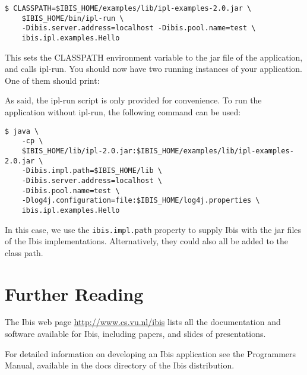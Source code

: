 \documentclass[a4paper,10pt]{article}
\begin{document}
\noindent
{\small
\begin{verbatim}
$ CLASSPATH=$IBIS_HOME/examples/lib/ipl-examples-2.0.jar \
    $IBIS_HOME/bin/ipl-run \
    -Dibis.server.address=localhost -Dibis.pool.name=test \
    ibis.ipl.examples.Hello
\end{verbatim}
}
\noindent

This sets the CLASSPATH environment variable to the jar file of the
application, and calls ipl-run. You should now have two running
instances of your application. One of them should print:

\noindent {\small \begin{verbatim} Server received: Hi there
\end{verbatim} } \noindent 

As said, the ipl-run script is only provided for convenience. To run
the application without ipl-run, the following command can be used:

\noindent
{\small
\begin{verbatim}
$ java \
    -cp \
    $IBIS_HOME/lib/ipl-2.0.jar:$IBIS_HOME/examples/lib/ipl-examples-2.0.jar \
    -Dibis.impl.path=$IBIS_HOME/lib \
    -Dibis.server.address=localhost \
    -Dibis.pool.name=test \
    -Dlog4j.configuration=file:$IBIS_HOME/log4j.properties \
    ibis.ipl.examples.Hello
\end{verbatim}
}
\noindent

In this case, we use the \texttt{ibis.impl.path} property to supply Ibis
with the jar files of the Ibis implementations. Alternatively, they
could also all be added to the class path.

\section{Further Reading}

The Ibis web page \url{http://www.cs.vu.nl/ibis} lists all
the documentation and software available for Ibis, including papers, and
slides of presentations.

For detailed information on developing an Ibis application see the
Programmers Manual, available in the docs directory of the Ibis
distribution.
\end{document}
